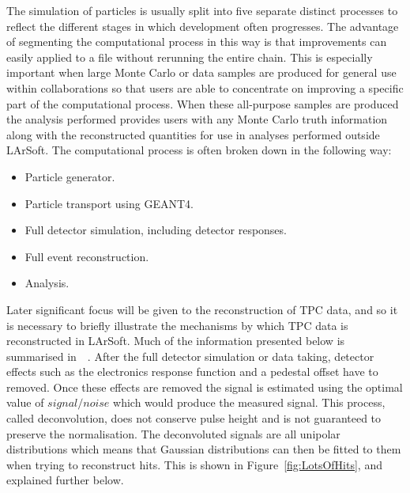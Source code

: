 The simulation of particles is usually split into five separate distinct processes to reflect the different stages in which development often progresses. The advantage of segmenting the computational process in this way is that improvements can easily applied to a file without rerunning the entire chain. This is especially important when large Monte Carlo or data samples are produced for general use within collaborations so that users are able to concentrate on improving a specific part of the computational process. When these all-purpose samples are produced the analysis performed provides users with any Monte Carlo truth information along with the reconstructed quantities for use in analyses performed outside LArSoft. The computational process is often broken down in the following way:
\begin{itemize}
\item Particle generator.
\item Particle transport using GEANT4.
\item Full detector simulation, including detector responses. 
\item Full event reconstruction.
\item Analysis.
\end{itemize}

Later significant focus will be given to the reconstruction of TPC data, and so it is necessary to briefly illustrate the mechanisms by which TPC data is reconstructed in LArSoft. Much of the information presented below is summarised in~\citep{LArSoftRecoNote}~\citep{LArSoftOrg}. After the full detector simulation or data taking, detector effects such as the electronics response function and a pedestal offset have to removed. Once these effects are removed the signal is estimated using the optimal value of $signal/noise$ which would produce the measured signal. This process, called deconvolution, does not conserve pulse height and is not guaranteed to preserve the normalisation. The deconvoluted signals are all unipolar distributions which means that Gaussian distributions can then be fitted to them when trying to reconstruct hits. This is shown in Figure~\ref{fig:LotsOfHits}, and explained further below.\\

